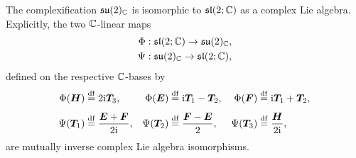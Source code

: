 \documentclass[11pt,reqno]{amsart}
\newcommand{\ii}{\mathrm{i}}
\begin{document}
\begin{Thm}[Complexification of $\su(2)$]\label{thm:su2-complexification}
The complexification $\mathfrak{su}(2)_{\mathbb{C}}$ is isomorphic to $\mathfrak{sl}(2;\mathbb{C})$
as a complex Lie algebra.  Explicitly, the two $\mathbb{C}$-linear maps
\[
\begin{aligned}
\Phi&:\mathfrak{sl}(2;\mathbb{C})\to\mathfrak{su}(2)_{\mathbb{C}}, \\
\Psi&:\mathfrak{su}(2)_{\mathbb{C}}\to\mathfrak{sl}(2;\mathbb{C}),
\end{aligned}
\]
defined on the respective $\mathbb{C}$-bases by
\[
\begin{aligned}
\Phi(\bm H)&\df 2\ii\bm T_3, &
\Phi(\bm E)&\df \ii\bm T_1-\bm T_2, &
\Phi(\bm F)&\df \ii\bm T_1+\bm T_2, \\[4pt]
\Psi(\bm T_1)&\df \frac{\bm E+\bm F}{2\ii}, &
\Psi(\bm T_2)&\df \frac{\bm F-\bm E}{2}, &
\Psi(\bm T_3)&\df \frac{\bm H}{2\ii},
\end{aligned}
\]
are mutually inverse complex Lie algebra isomorphisms.
\end{Thm}
\end{document}
